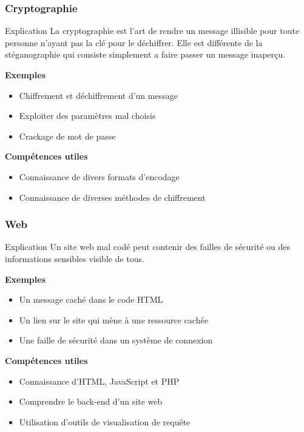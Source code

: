 \documentclass{beamer}
\begin{document}
\begin{frame}
\frametitle{Cryptographie}

\begin{block}{Explication}
    La cryptographie est l'art de rendre un message illisible pour toute personne n'ayant pas la clé pour le déchiffrer. Elle est différente de la stéganographie qui consiste simplement a faire passer un message inaperçu.
\end{block}

\pause

\textbf{Exemples}
\begin{itemize}
    \item Chiffrement et déchiffrement d'un message
    \item Exploiter des paramètres mal choisis
    \item Crackage de mot de passe
\end{itemize}

\pause

\textbf{Compétences utiles}
\begin{itemize}
    \item Connaissance de divers formats d'encodage
    \item Connaissance de diverses méthodes de chiffrement
\end{itemize}

\end{frame}


\begin{frame}
\frametitle{Web}


\begin{block}{Explication}
    Un site web mal codé peut contenir des failles de sécurité ou des informations sensibles visible de tous.
\end{block}

\pause

\textbf{Exemples}
\begin{itemize}
    \item Un message caché dans le code HTML
    \item Un lien sur le site qui mène à une ressource cachée
    \item Une faille de sécurité dans un système de connexion
\end{itemize}

\pause

\textbf{Compétences utiles}
\begin{itemize}
    \item Connaissance d'HTML, JavaScript et PHP
    \item Comprendre le back-end d'un site web
    \item Utilisation d'outils de visualisation de requête
\end{itemize}


\end{frame}
\end{document}
